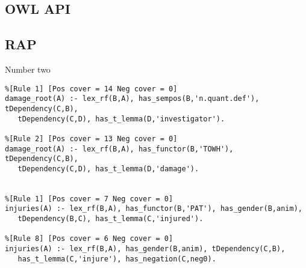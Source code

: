 \documentclass[xcolor=dvipsnames]{beamer}
\begin{document}


\subsection{OWL API} 
\frame{\tableofcontents[currentsubsection]}

\subsection{RAP} 
\frame{\tableofcontents[currentsubsection]}

\begin{frame}[fragile]{Number two}
\begin{verbatim}
%[Rule 1] [Pos cover = 14 Neg cover = 0]
damage_root(A) :- lex_rf(B,A), has_sempos(B,'n.quant.def'), tDependency(C,B),
   tDependency(C,D), has_t_lemma(D,'investigator').

%[Rule 2] [Pos cover = 13 Neg cover = 0]
damage_root(A) :- lex_rf(B,A), has_functor(B,'TOWH'), tDependency(C,B),
   tDependency(C,D), has_t_lemma(D,'damage').


%[Rule 1] [Pos cover = 7 Neg cover = 0]
injuries(A) :- lex_rf(B,A), has_functor(B,'PAT'), has_gender(B,anim),
   tDependency(B,C), has_t_lemma(C,'injured').

%[Rule 8] [Pos cover = 6 Neg cover = 0]
injuries(A) :- lex_rf(B,A), has_gender(B,anim), tDependency(C,B),
   has_t_lemma(C,'injure'), has_negation(C,neg0).
\end{verbatim}
\end{frame}
\end{document}
